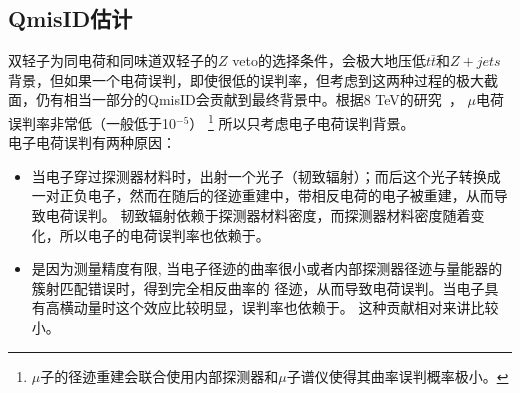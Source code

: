 \subsection{QmisID估计}\label{sec:QmisID_estimation}
双轻子为同电荷和同味道双轻子的$Z$ veto的选择条件，会极大地压低$t\bar{t}$和$Z+jets$背景，但如果一个电荷误判，即使很低的误判率，但考虑到这两种过程的极大截面，仍有相当一部分的QmisID会贡献到最终背景中。根据8 TeV的研究~\cite{MuonQmisIDnote}，
$\mu$电荷误判率非常低（一般低于10$^{-5}$）
\footnote{$\mu$子的径迹重建会联合使用内部探测器和$\mu$子谱仪使得其曲率误判概率极小。}
所以只考虑电子电荷误判背景。\\
电子电荷误判有两种原因：
\begin{itemize}
  \item 当电子穿过探测器材料时，出射一个光子（韧致辐射）；而后这个光子转换成一对正负电子，然而在随后的径迹重建中，带相反电荷的电子被重建，从而导致电荷误判。
韧致辐射依赖于探测器材料密度，而探测器材料密度随着\abseta 变化，所以电子的电荷误判率也依赖于\abseta。 
  \item 是因为测量精度有限, 当电子径迹的曲率很小或者内部探测器径迹与量能器的簇射匹配错误时，得到完全相反曲率的
径迹，从而导致电荷误判。当电子具有高横动量时这个效应比较明显，误判率也依赖于\pt。
 这种贡献相对来讲比较小。
\end{itemize}
